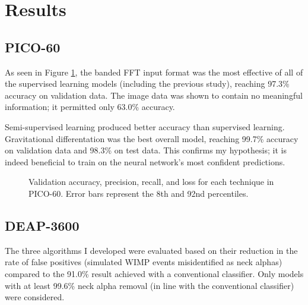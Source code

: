 \documentclass[12pt]{article}
\begin{document}
\section{Results}

\subsection{PICO-60}

As seen in Figure \ref{pico_final_results}, the banded FFT input format was the most effective of all of the supervised learning models (including the previous study), reaching 97.3\% accuracy on validation data. The image data was shown to contain no meaningful information; it permitted only 63.0\% accuracy.

Semi-supervised learning produced better accuracy than supervised learning. Gravitational differentation was the best overall model, reaching 99.7\% accuracy on validation data and 98.3\% on test data. This confirms my hypothesis; it is indeed beneficial to train on the neural network's most confident predictions.

\begin{figure}[ht]
    \centering
    \caption{\label{pico_final_results} Validation accuracy, precision, recall, and loss for each technique in PICO-60. Error bars represent the 8th and 92nd percentiles.}
\end{figure}

\subsection{DEAP-3600}

The three algorithms I developed were evaluated based on their reduction in the rate of false positives (simulated WIMP events misidentified as neck alphas) compared to the 91.0\% result achieved with a conventional classifier. Only models with at least 99.6\% neck alpha removal (in line with the conventional classifier) were considered.
\end{document}
